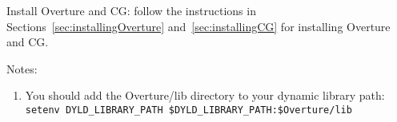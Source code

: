  Install Overture and CG: follow the instructions in Sections~\ref{sec:installingOverture} and~\ref{sec:installingCG}
for installing Overture and CG. 

Notes:
\begin{enumerate}
    \item You should add the Overture/lib directory to your dynamic library path:
       {\tt setenv DYLD\_LIBRARY\_PATH \${DYLD\_LIBRARY\_PATH}:\${Overture}/lib}
\end{enumerate}


